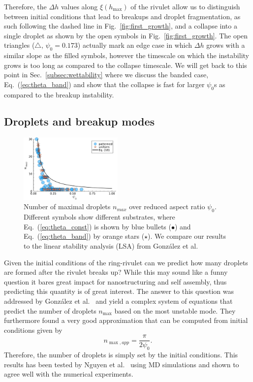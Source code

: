 \documentclass[twoside,twocolumn,9pt]{article}
\begin{document}
Therefore, the $\Delta h$ values along $\xi(h_{\max})$ of the rivulet allow us to distinguish between initial conditions that lead to breakups and droplet fragmentation, as such following the dashed line in Fig.~\ref{fig:first_growth}, and a collapse into a single droplet as shown by the open symbols in Fig.~\ref{fig:first_growth}.
The open triangles ($\triangle$, $\psi_0 = 0.173$) actually mark an edge case in which $\Delta h$ grows with a similar slope as the filled symbols, however the timescale on which the instability grows is too long as compared to the collapse timescale. 
We will get back to this point in Sec.~\ref{subsec:wettability} where we discuss the banded case, Eq.~(\ref{eq:theta_band}) and show that the collapse is fast for larger $\psi_0$s as compared to the breakup instability.

\subsection{Droplets and breakup modes}\label{subsec:drop-counting}
\begin{figure}
    \centering
    \includegraphics[width=0.45\textwidth]{assets/LSA_droplets.pdf}
    \caption{Number of maximal droplets $n_{max}$ over reduced aspect ratio $\psi_0$.
    Different symbols show different substrates, where Eq.~(\ref{eq:theta_const}) is shown by blue bullets (\textcolor{jlblue}{$\bullet$}) and Eq.~(\ref{eq:theta_band}) by orange stars (\textcolor{jlorange}{$\star$}).
    We compare our results to the linear stability analysis (LSA) from Gonz{\'a}lez et al.~\cite{gonzalezStabilityLiquidRing2013}}
    \label{fig:max_drops}
\end{figure}

Given the initial conditions of the ring-rivulet can we predict how many droplets are formed after the rivulet breaks up?
While this may sound like a funny question it bares great impact for nanostructuring and self assembly, thus predicting this quantity is of great interest.
The answer to this question was addressed by Gonz{\'a}lez et al.~\cite{gonzalezStabilityLiquidRing2013} and yield a complex system of equations that predict the number of droplets $n_{\max}$ based on the most unstable mode.
They furthermore found a very good approximation that can be computed from initial conditions given by 
\begin{equation}\label{eq:maxDrops}
    n_{\max, app} = \frac{\pi}{2\psi_0}.
\end{equation}
Therefore, the number of droplets is simply set by the initial conditions.
This results has been tested by Nguyen et al.~\cite{nguyenCompetitionCollapseBreakup2012} using MD simulations and shown to agree well with the numerical experiments. 
\end{document}
